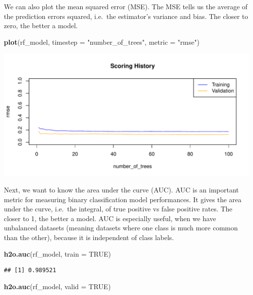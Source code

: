 \documentclass[]{article}
\newenvironment{Shaded}{\begin{snugshade}}{\end{snugshade}}
\newcommand{\KeywordTok}[1]{\textcolor[rgb]{0.13,0.29,0.53}{\textbf{{#1}}}}
\newcommand{\DataTypeTok}[1]{\textcolor[rgb]{0.13,0.29,0.53}{{#1}}}
\newcommand{\StringTok}[1]{\textcolor[rgb]{0.31,0.60,0.02}{{#1}}}
\newcommand{\OtherTok}[1]{\textcolor[rgb]{0.56,0.35,0.01}{{#1}}}
\newcommand{\NormalTok}[1]{{#1}}
\begin{document}
We can also plot the mean squared error (MSE). The MSE tells us the
average of the prediction errors squared, i.e.~the estimator's variance
and bias. The closer to zero, the better a model.

\begin{Shaded}
\begin{Highlighting}[]
\KeywordTok{plot}\NormalTok{(rf_model,}
     \DataTypeTok{timestep =} \StringTok{"number_of_trees"}\NormalTok{,}
     \DataTypeTok{metric =} \StringTok{"rmse"}\NormalTok{)}
\end{Highlighting}
\end{Shaded}

\begin{center}\includegraphics{webinar_code_files/figure-latex/unnamed-chunk-56-1} \end{center}

Next, we want to know the area under the curve (AUC). AUC is an
important metric for measuring binary classification model performances.
It gives the area under the curve, i.e.~the integral, of true positive
vs false positive rates. The closer to 1, the better a model. AUC is
especially useful, when we have unbalanced datasets (meaning datasets
where one class is much more common than the other), because it is
independent of class labels.

\begin{Shaded}
\begin{Highlighting}[]
\KeywordTok{h2o.auc}\NormalTok{(rf_model, }\DataTypeTok{train =} \OtherTok{TRUE}\NormalTok{)}
\end{Highlighting}
\end{Shaded}

\begin{verbatim}
## [1] 0.989521
\end{verbatim}

\begin{Shaded}
\begin{Highlighting}[]
\KeywordTok{h2o.auc}\NormalTok{(rf_model, }\DataTypeTok{valid =} \OtherTok{TRUE}\NormalTok{)}
\end{Highlighting}
\end{Shaded}
\end{document}
